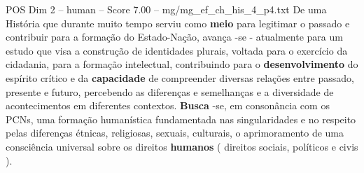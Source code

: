 \begin{textsample}{POS Dim 2 – human – Score 7.00 – mg/mg\_ef\_ch\_his\_4\_p4.txt}  \label{ex:f2_pos_004}
De uma História que durante muito tempo serviu como \textbf{meio} para legitimar o passado e contribuir para a formação do Estado-Nação, avança -se - atualmente para um estudo que visa a construção de identidades plurais, voltada para o exercício da cidadania, para a formação intelectual, contribuindo para o \textbf{desenvolvimento} do espírito crítico e da \textbf{capacidade} de compreender diversas relações entre passado, presente e futuro, percebendo as diferenças e semelhanças e a diversidade de acontecimentos em diferentes contextos. \textbf{Busca} -se, em consonância com os PCNs, uma formação humanística fundamentada nas singularidades e no respeito pelas diferenças étnicas, religiosas, sexuais, culturais, o aprimoramento de uma consciência universal sobre os direitos \textbf{humanos} ( direitos sociais, políticos e civis ).

\end{textsample}
